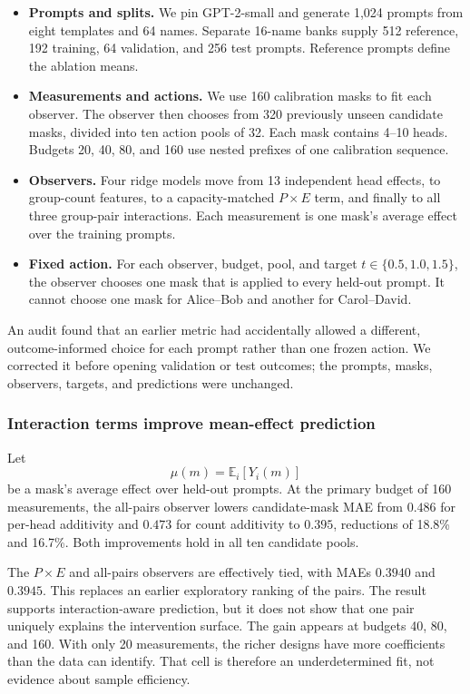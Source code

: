 \begin{itemize}
  \item \textbf{Prompts and splits.} We pin GPT-2-small and generate 1,024
  prompts from eight templates and 64 names. Separate 16-name banks supply 512
  reference, 192 training, 64 validation, and 256 test prompts. Reference
  prompts define the ablation means.

  \item \textbf{Measurements and actions.} We use 160 calibration masks to
  fit each observer. The observer then chooses from 320 previously unseen
  candidate masks, divided into ten action pools of 32. Each mask contains
  4--10 heads. Budgets 20, 40, 80, and 160 use nested prefixes of one
  calibration sequence.

  \item \textbf{Observers.} Four ridge models move from 13 independent head
  effects, to group-count features, to a capacity-matched $P\times E$ term,
  and finally to all three group-pair interactions. Each measurement is one
  mask's average effect over the training prompts.

  \item \textbf{Fixed action.} For each observer, budget, pool, and target
  $t\in\{0.5,1.0,1.5\}$, the observer chooses one mask that is applied to every
  held-out prompt. It cannot choose one mask for Alice--Bob and another for
  Carol--David.
\end{itemize}

An audit found that an earlier metric had accidentally allowed a different,
outcome-informed choice for each prompt rather than one frozen action. We
corrected it before opening validation or test outcomes; the prompts, masks,
observers, targets, and predictions were unchanged.

\subsubsection{Interaction terms improve mean-effect prediction}

Let
\[
\mu(m)=\mathbb E_i[Y_i(m)]
\]
be a mask's average effect over held-out prompts. At the primary budget of 160
measurements, the all-pairs observer lowers candidate-mask MAE from $0.486$ for
per-head additivity and $0.473$ for count additivity to $0.395$, reductions of
18.8\% and 16.7\%. Both improvements hold in all ten candidate pools.

The $P\times E$ and all-pairs observers are effectively tied, with MAEs
$0.3940$ and $0.3945$. This replaces an earlier exploratory ranking of the
pairs. The result supports interaction-aware prediction, but it does not show
that one pair uniquely explains the intervention surface. The gain appears at
budgets 40, 80, and 160. With only 20 measurements, the richer designs have
more coefficients than the data can identify. That cell is therefore an
underdetermined fit, not evidence about sample efficiency.

